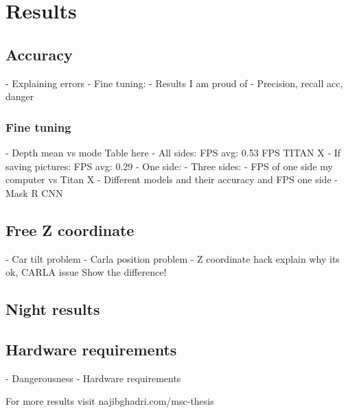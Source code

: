 \chapter{Results}
\label{chap:results}

\section{Accuracy}
- Explaining errors
- Fine tuning:
- Results I am proud of
- Precision, recall acc, danger


\subsection{Fine tuning}
- Depth mean vs mode
Table here
- All sides: FPS avg:  0.53 FPS TITAN X
  - If saving pictures: FPS avg:  0.29
- One side:
- Three sides:
- FPS of one side my computer vs Titan X
- Different models and their accuracy and FPS one side
- Mask R CNN
\section{Free Z coordinate}
- Car tilt problem
- Carla position problem
- Z coordinate hack explain why its ok, CARLA issue
    Show the difference!

\section{Night results}

\section{Hardware requirements}
- Dangerousness
- Hardware requirements

For more results visit najibghadri.com/msc-thesis